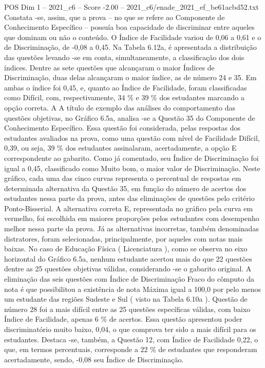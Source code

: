 \begin{textsample}{POS Dim 1 – 2021\_c6 – Score -2.00 – 2021\_c6/enade\_2021\_ef\_be61acbd52.txt}
Constata -se, assim, que a prova – no que se refere ao Componente de Conhecimento Específico – possuía boa capacidade de discriminar entre aqueles que dominam ou não o conteúdo.
O Índice de Facilidade variou de 0,06 a 0,61 e o de Discriminação, de -0,08 a 0,45.
Na Tabela 6.12a, é apresentada a distribuição das questões levando -se em conta, simultaneamente, a classificação dos dois índices.
Dentre as sete questões que alcançaram o maior Índices de Discriminação, duas delas alcançaram o maior índice, as de número 24 e 35.
Em ambas o índice foi 0,45, e, quanto ao Índice de Facilidade, foram classificadas como Difícil, com, respectivamente, 34 \% e 39 \% dos estudantes marcando a opção correta.
A A título de exemplo das análises do comportamento das questões objetivas, no Gráfico 6.5a, analisa -se a Questão 35 do Componente de Conhecimento Específico.
Essa questão foi considerada, pelas respostas dos estudantes avaliados na prova, como uma questão com nível de Facilidade Difícil, 0,39, ou seja, 39 \% dos estudantes assinalaram, acertadamente, a opção E correspondente ao gabarito.
Como já comentado, seu Índice de Discriminação foi igual a 0,45, classificado como Muito bom, o maior valor de Discriminação.
Neste gráfico, cada uma das cinco curvas representa o percentual de respostas em determinada alternativa da Questão 35, em função do número de acertos dos estudantes nessa parte da prova, antes das eliminações de questões pelo critério Ponto-Bisserial.
A alternativa correta E, representada no gráfico pela curva em vermelho, foi escolhida em maiores proporções pelos estudantes com desempenho melhor nessa parte da prova.
Já as alternativas incorretas, também denominadas distratores, foram selecionadas, principalmente, por aqueles com notas mais baixas.
No caso de Educação Física ( Licenciatura ), como se observa no eixo horizontal do Gráfico 6.5a, nenhum estudante acertou mais do que 22 questões dentre as 25 questões objetivas válidas, considerando -se o gabarito original.
A eliminação das seis questões com Índice de Discriminação Fraco do cômputo da nota é que possibilitou a existência de nota Máxima igual a 100,0 por pelo menos um estudante das regiões Sudeste e Sul ( visto na Tabela 6.10a ).
Questão de número 28 foi a mais difícil entre as 25 questões específicas válidas, com baixo Índice de Facilidade, apenas 6 \% de acertos.
Essa questão apresentou poder discriminatório muito baixo, 0,04, o que comprova ter sido a mais difícil para os estudantes.
Destaca -se, também, a Questão 12, com Índice de Facilidade 0,22, o que, em termos percentuais, corresponde a 22 \% de estudantes que responderam acertadamente, sendo, -0,08 seu Índice de Discriminação.

\end{textsample}
